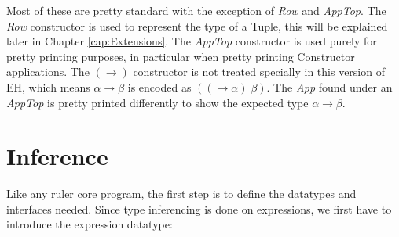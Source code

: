 \documentclass[twoside, titlepage, openright, a4paper]{book}
\begin{document}
Most of these are pretty standard with the exception of \emph{Row} and \emph{AppTop}. The \emph{Row} constructor is used to represent the type of a Tuple, this will be explained later in Chapter \ref{cap:Extensions}. 
The \emph{AppTop} constructor is used purely for pretty printing purposes, in particular when pretty printing Constructor applications. The \ensuremath{(\to )} constructor is not treated specially in this version of EH, which means \ensuremath{\alpha\to \beta} is encoded as \ensuremath{((\to \alpha)\;\beta)}. The \emph{App} found under an \emph{AppTop} is pretty printed differently to show the expected type \ensuremath{\alpha\to \beta}.

\section{Inference}
Like any ruler core program, the first step is to define the datatypes and interfaces needed. Since type inferencing is done on expressions, we first have to introduce the expression datatype:
\end{document}
